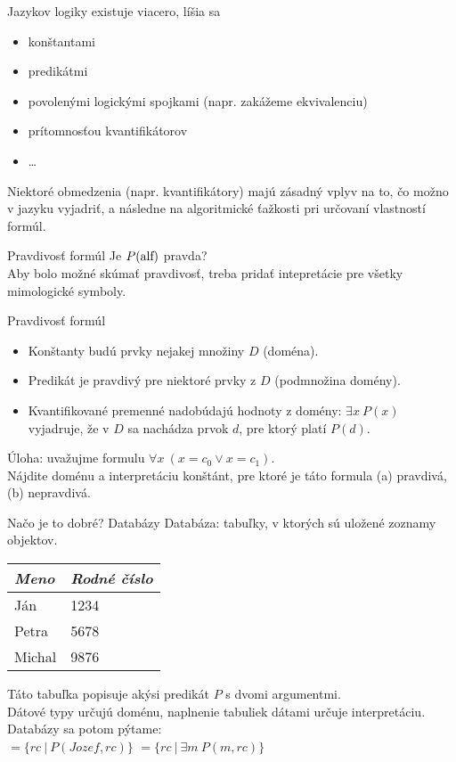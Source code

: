 \documentclass[12pt]{beamer}
\theoremstyle{definition}
\let\A\forall
\let\E\exists
\begin{document}
\begin{frame}
Jazykov logiky existuje viacero, líšia sa
\begin{itemize}
\item konštantami
\item predikátmi
\item povolenými logickými spojkami (napr. zakážeme ekvivalenciu)
\item prítomnosťou kvantifikátorov
\item \dots
\end{itemize}
Niektoré obmedzenia (napr. kvantifikátory) majú zásadný vplyv na to, čo možno v jazyku vyjadriť, a následne na algoritmické ťažkosti pri určovaní vlastností formúl.
\end{frame}

\begin{frame}{Pravdivosť formúl}
Je $P(\hbox{alf})$ pravda?\\[5mm]
Aby bolo možné skúmať pravdivosť, treba pridať \alert{intepretácie} pre všetky mimologické symboly.
\end{frame}

\begin{frame}{Pravdivosť formúl}
\begin{itemize}
\item Konštanty budú prvky nejakej množiny $D$ (doména).
\pause
\item Predikát je pravdivý pre niektoré prvky z $D$ (podmnožina domény).
\pause
\item Kvantifikované premenné nadobúdajú hodnoty z domény:
	$\E x\ P(x)$ vyjadruje, že v $D$ sa nachádza prvok $d$, pre ktorý platí $P(d)$.
\end{itemize}
\pause
\vspace*{3mm}
Úloha: uvažujme formulu $\A x\ (x = c_0 \lor x = c_1)$.\\
Nájdite doménu a interpretáciu konštánt, pre ktoré je táto formula
(a) pravdivá, (b) nepravdivá.
\end{frame}

\begin{frame}{Načo je to dobré? Databázy}
Databáza: tabuľky, v ktorých sú uložené zoznamy objektov.
\begin{table}[h!]
    \centering
	\begin{tabular}{|l|l|}
        \hline
        \emph{Meno} & \emph{Rodné číslo} \\
        \hline
        Ján & 1234 \\
        Petra & 5678 \\
        Michal & 9876 \\
        \hline
    \end{tabular}
\end{table}
Táto tabuľka popisuje akýsi predikát $P$ s dvomi argumentmi.\\
Dátové typy určujú doménu, naplnenie tabuliek dátami určuje interpretáciu.\\[3mm]
Databázy sa potom pýtame:\\
 $ = \{rc\ |\ P(Jozef, rc)\}$
\hspace*{21.5mm} $ = \{rc\ |\ \E m\ P(m, rc)\}$
\end{frame}
\end{document}
